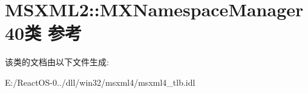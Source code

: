 \hypertarget{class_m_s_x_m_l2_1_1_m_x_namespace_manager40}{}\section{M\+S\+X\+M\+L2\+:\+:M\+X\+Namespace\+Manager40类 参考}
\label{class_m_s_x_m_l2_1_1_m_x_namespace_manager40}


该类的文档由以下文件生成\+:\begin{DoxyCompactItemize}
\item 
E\+:/\+React\+O\+S-\/0../dll/win32/msxml4/msxml4\+\_\+tlb.\+idl\end{DoxyCompactItemize}
